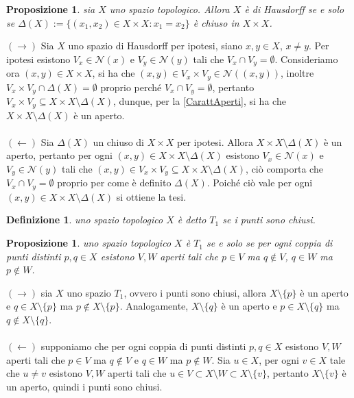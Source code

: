 \documentclass[oneside, 11pt]{amsbook}
\makeatletter
\newcommand{\0}{{(0)}}
\newcommand{\3}{{(3)}}
\theoremstyle{colonplain}
\newtheorem{prop}[thm]{Proposizione}
\theoremstyle{colondefinition}
\newtheorem{defn}[thm]{Definizione}
\theoremstyle{colonremark}
\numberwithin{equation}{chapter}
\renewcommand{\proofname}{Dimostrazione}
\renewenvironment{proof}[1][\proofname]{\par
  \pushQED{\qed}%
  \normalfont \topsep6\p@\@plus6\p@\relax
  \trivlist
  \item[\hskip\labelsep\bfseries #1:]\ignorespaces
}{%
  \popQED\endtrivlist\@endpefalse
}
\makeatother
\begin{document}
\begin{prop}
sia $X$ uno spazio topologico. Allora $X$ è di Hausdorff se e solo se $\Delta(X) := \{ (x_1, x_2) \in X \times X : x_1 = x_2 \}$ è chiuso in $X \times X$.
\end{prop}
\begin{proof}
$(\rightarrow)$ Sia $X$ uno spazio di Hausdorff per ipotesi, siano $x, y \in X$, $x \neq y$. Per ipotesi esistono $V_x \in \mathcal{N}(x)$ e $V_y \in \mathcal{N}(y)$ tali che $V_x \cap V_y = \emptyset$. Consideriamo ora $(x, y) \in X \times X$, si ha che $(x, y) \in V_x \times V_y \in \mathcal{N}((x, y))$, inoltre $V_x \times V_y \cap \Delta (X) = \emptyset$ proprio perché $V_x \cap V_y = \emptyset$, pertanto $V_x \times V_y \subseteq X \times X \setminus \Delta (X)$, dunque, per la \ref{CarattAperti}, si ha che $X \times X \setminus \Delta (X)$ è un aperto. \\ \\
$(\leftarrow)$ Sia $\Delta (X)$ un chiuso di $X \times X$ per ipotesi. Allora $X \times X \setminus \Delta (X)$ è un aperto, pertanto per ogni $(x, y) \in X \times X \setminus \Delta (X)$ esistono $V_x \in \mathcal{N}(x)$ e $V_y \in \mathcal{N}(y)$ tali che $(x, y) \in V_x \times V_y \subseteq X \times X \setminus \Delta (X)$, ciò comporta che $V_x \cap V_y = \emptyset$ proprio per come è definito $\Delta (X)$. Poiché ciò vale per ogni $(x, y) \in X \times X \setminus \Delta (X)$ si ottiene la tesi.
\end{proof}
\begin{defn}
uno spazio topologico $X$ è detto $T_1$ se i punti sono chiusi.
\end{defn}
\begin{prop}
uno spazio topologico $X$ è $T_1$ se e solo se per ogni coppia di punti distinti $p, q \in X$ esistono $V, W$ aperti tali che $p \in V$ ma $q \not\in V$, $q \in W$ ma $p \not\in W$.
\end{prop}
\begin{proof}
$(\rightarrow)$ sia $X$ uno spazio $T_1$, ovvero i punti sono chiusi, allora $X \setminus \{ p \}$ è un aperto e $q \in X \setminus \{ p \}$ ma $p \not\in X \setminus \{ p \}$. Analogamente, $X \setminus \{ q \}$ è un aperto e $p \in X \setminus \{ q \}$ ma $q \not\in X \setminus \{ q \}$. \\ \\
$(\leftarrow)$ supponiamo che per ogni coppia di punti distinti $p, q \in X$ esistono $V, W$ aperti tali che $p \in V$ ma $q \not\in V$ e $q \in W$ ma $p \not\in W$. Sia $u \in X$, per ogni $v \in X$ tale che $u \neq v$ esistono $V, W$ aperti tali che $u \in V \subset X \setminus W \subset X \setminus \{ v \}$, pertanto $X \setminus \{ v \}$ è un aperto, quindi i punti sono chiusi.
\end{proof}
\end{document}
